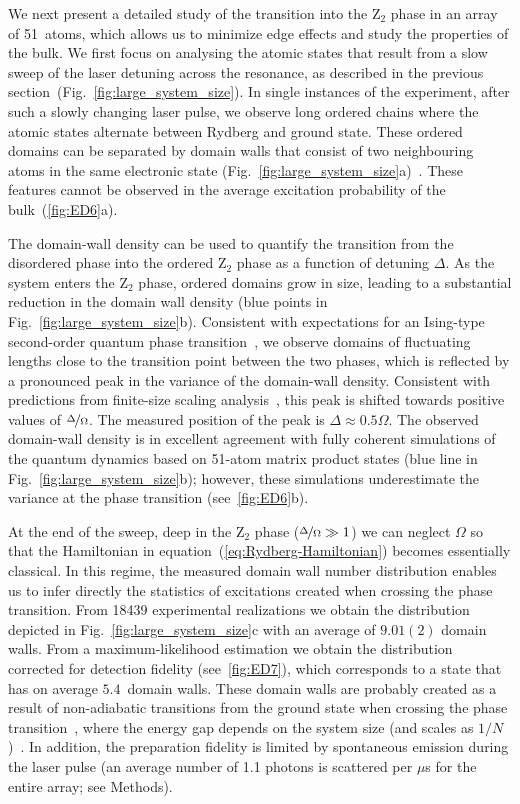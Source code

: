 \documentclass[prl,nobalancelastpage,twocolumn,superscriptaddress,nofootinbib]{revtex4}
\begin{document}
We next present a detailed study of the transition into the Z$_2$ phase in an
array of 51~atoms, which allows us to minimize edge effects and study the
properties of the bulk. We first focus on analysing the atomic states that result
from a slow sweep of the laser detuning across the resonance, as described in
the previous section~(Fig.~\ref{fig:large_system_size}). In single instances of
the experiment, after such a slowly changing laser pulse, we observe long
ordered chains where the atomic states alternate between Rydberg and ground
state. These ordered domains can be separated by domain walls that consist of
two neighbouring atoms in the same electronic state
(Fig.~\ref{fig:large_system_size}a)~\cite{Sachdev2009}. These
features cannot be observed in the average excitation probability of the
bulk~(\ref{fig:ED6}a). 

The domain-wall density can be used to quantify the transition from the
disordered phase into the ordered Z$_2$ phase as a function of detuning
$\Delta$. As the system enters the Z$_2$ phase, ordered domains grow in size,
leading to a substantial reduction in the domain wall density (blue points in
Fig.~\ref{fig:large_system_size}b).  Consistent with expectations for an
Ising-type second-order quantum phase transition~\cite{Sachdev2009}, we observe
domains of fluctuating lengths close to the transition point between the two
phases, which is reflected by a pronounced peak in the variance of the
domain-wall density.  Consistent with predictions from finite-size scaling
analysis~\cite{Fendley2004,Sachdev2002}, this peak is shifted towards positive
values of $\nicefrac{\Delta}{\Omega}$. The measured position of the peak is
$\Delta\approx0.5\Omega$.  The observed domain-wall density is in excellent
agreement with fully coherent simulations of the quantum dynamics based on
51-atom matrix product states (blue line in Fig.~\ref{fig:large_system_size}b);
however, these simulations underestimate the variance at the phase transition
(see~\ref{fig:ED6}b).

At the end of the sweep, deep in the Z$_2$ phase
($\nicefrac{\Delta}{\Omega}\gg1$) we can neglect $\Omega$ so that the
Hamiltonian in equation~(\ref{eq:Rydberg-Hamiltonian}) becomes essentially classical. In
this regime, the measured domain wall number distribution enables us to
infer directly the statistics of excitations created when crossing the phase transition.
From 18439 experimental realizations we obtain the distribution depicted in
Fig.~\ref{fig:large_system_size}c with an average of $9.01(2)$ domain walls.
From a maximum-likelihood estimation we obtain the distribution corrected for
detection fidelity (see~\ref{fig:ED7}), which corresponds to a state that has
on average $5.4$~domain walls.  These domain walls are probably created as a result
of non-adiabatic transitions from the ground state when crossing the phase
transition~\cite{Zurek2005}, where the energy gap depends on the system size
(and scales as $1/N$)~\cite{Sachdev2002}.  In addition, the preparation
fidelity is limited by spontaneous emission during the laser pulse (an
average number of 1.1 photons is scattered per $\mu$s for the entire array;
see Methods).
\end{document}

